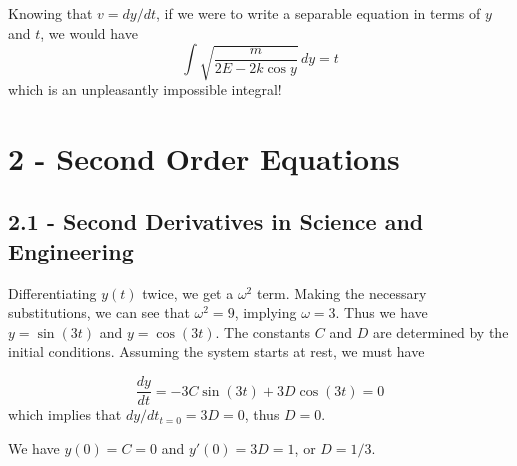 \documentclass[a4paper]{article}
\begin{document}
Knowing that \(v = dy/dt\), if we were to write a separable equation in terms of \(y\) and \(t\), we would have
\[
	\int \sqrt{\frac{m}{2E - 2k \cos y}} \, dy = t
\]
which is an unpleasantly impossible integral!


\newpage
\section{\textsf{2 - Second Order Equations}}

\subsection{\textsf{2.1 - Second Derivatives in Science and Engineering}}


Differentiating \(y \!\left( t \right) \) twice, we get a \(\omega^{2}\) term. Making the necessary substitutions, we can see that \(\omega^{2} = 9\), implying \(\omega = 3\). Thus we have \(y = \sin\left( 3t \right)\) and \(y = \cos\left( 3t \right)\). The constants \(C\) and \(D\) are determined by the initial conditions. Assuming the system starts at rest, we must have

\[
	\frac{d y}{d t} = - 3C \sin\left( 3t \right) + 3D \cos\left( 3t \right) = 0
\]
which implies that \(dy / dt_{t = 0} = 3D = 0\), thus \(D = 0\).

\vspace{12pt}


We have \(y \!\left( 0 \right) = C = 0\) and \(y' \!\left( 0 \right) = 3D = 1\), or \(D = 1/3\).

\newpage

\end{document}
